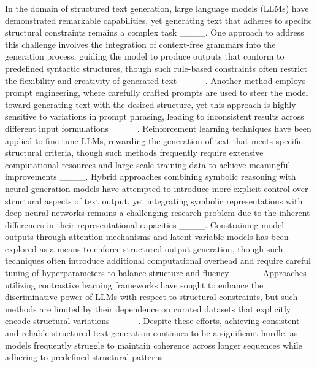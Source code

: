 In the domain of structured text generation, large language models (LLMs) have demonstrated remarkable capabilities, yet generating text that adheres to specific structural constraints remains a complex task ____. One approach to address this challenge involves the integration of context-free grammars into the generation process, guiding the model to produce outputs that conform to predefined syntactic structures, though such rule-based constraints often restrict the flexibility and creativity of generated text ____. Another method employs prompt engineering, where carefully crafted prompts are used to steer the model toward generating text with the desired structure, yet this approach is highly sensitive to variations in prompt phrasing, leading to inconsistent results across different input formulations ____. Reinforcement learning techniques have been applied to fine-tune LLMs, rewarding the generation of text that meets specific structural criteria, though such methods frequently require extensive computational resources and large-scale training data to achieve meaningful improvements ____. Hybrid approaches combining symbolic reasoning with neural generation models have attempted to introduce more explicit control over structural aspects of text output, yet integrating symbolic representations with deep neural networks remains a challenging research problem due to the inherent differences in their representational capacities ____. Constraining model outputs through attention mechanisms and latent-variable models has been explored as a means to enforce structured output generation, though such techniques often introduce additional computational overhead and require careful tuning of hyperparameters to balance structure and fluency ____. Approaches utilizing contrastive learning frameworks have sought to enhance the discriminative power of LLMs with respect to structural constraints, but such methods are limited by their dependence on curated datasets that explicitly encode structural variations ____. Despite these efforts, achieving consistent and reliable structured text generation continues to be a significant hurdle, as models frequently struggle to maintain coherence across longer sequences while adhering to predefined structural patterns ____.

